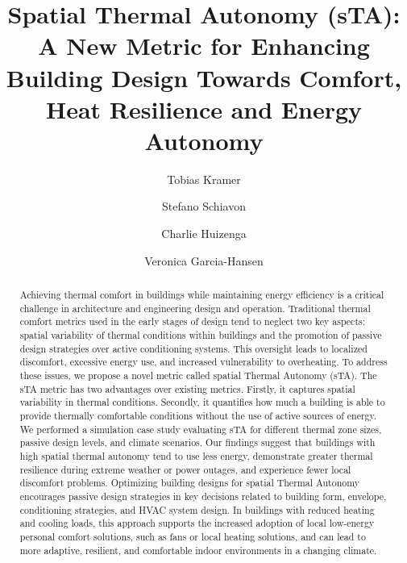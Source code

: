 
\begin{frontmatter}

\title{Spatial Thermal Autonomy (sTA): A New Metric for Enhancing Building Design Towards Comfort, Heat Resilience and Energy Autonomy}


\author[inst1]{Tobias Kramer}


\author[inst1]{Stefano Schiavon}

\author[inst1]{Charlie Huizenga}

\author[inst2]{Veronica Garcia-Hansen}






\begin{abstract}

Achieving thermal comfort in buildings while maintaining energy efficiency is a critical challenge in architecture and engineering design and operation. Traditional thermal comfort metrics used in the early stages of design tend to neglect two key aspects: spatial variability of thermal conditions within buildings and the promotion of passive design strategies over active conditioning systems. This oversight leads to localized discomfort, excessive energy use, and increased vulnerability to overheating.
To address these issues, we propose a novel metric called spatial Thermal Autonomy (sTA). The sTA metric has two advantages over existing metrics. Firstly, it captures spatial variability in thermal conditions. Secondly, it quantifies how much a building is able to provide thermally comfortable conditions without the use of active sources of energy.
We performed a simulation case study evaluating sTA for different thermal zone sizes, passive design levels, and climate scenarios. Our findings suggest that buildings with high spatial thermal autonomy tend to use less energy, demonstrate greater thermal resilience during extreme weather or power outages, and experience fewer local discomfort problems.
Optimizing building designs for spatial Thermal Autonomy encourages passive design strategies in key decisions related to building form, envelope, conditioning strategies, and HVAC system design. In buildings with reduced heating and cooling loads, this approach supports the increased adoption of local low-energy personal comfort solutions, such as fans or local heating solutions, and can lead to more adaptive, resilient, and comfortable indoor environments in a changing climate.



\end{abstract}
\end{frontmatter}
